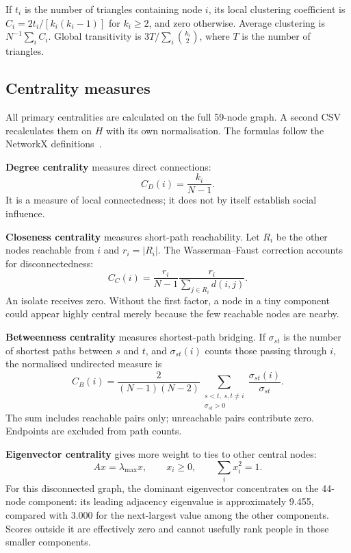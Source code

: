 \documentclass[11pt,a4paper]{article}
\begin{document}
If $t_i$ is the number of triangles containing node $i$, its local clustering
coefficient is $C_i=2t_i/[k_i(k_i-1)]$ for $k_i\geq2$, and zero otherwise.
Average clustering is $N^{-1}\sum_i C_i$. Global transitivity is
$3T/\sum_i\binom{k_i}{2}$, where $T$ is the number of triangles.

\subsection{Centrality measures}
All primary centralities are calculated on the full 59-node graph. A second CSV
recalculates them on $H$ with its own normalisation. The formulas follow the
NetworkX definitions~\cite{nxcentrality}.

\textbf{Degree centrality} measures direct connections:
\begin{equation}
C_D(i)=\frac{k_i}{N-1}.
\end{equation}
It is a measure of local connectedness; it does not by itself establish social
influence.

\textbf{Closeness centrality} measures short-path reachability. Let $R_i$ be the
other nodes reachable from $i$ and $r_i=|R_i|$. The Wasserman--Faust correction
accounts for disconnectedness:
\begin{equation}
C_C(i)=\frac{r_i}{N-1}\frac{r_i}{\sum_{j\in R_i}d(i,j)}.
\end{equation}
An isolate receives zero. Without the first factor, a node in a tiny component
could appear highly central merely because the few reachable nodes are nearby.

\textbf{Betweenness centrality} measures shortest-path bridging. If $\sigma_{st}$
is the number of shortest paths between $s$ and $t$, and $\sigma_{st}(i)$ counts
those passing through $i$, the normalised undirected measure is
\begin{equation}
C_B(i)=\frac{2}{(N-1)(N-2)}
\sum_{\substack{s<t,\;s,t\ne i\\\sigma_{st}>0}}
\frac{\sigma_{st}(i)}{\sigma_{st}}.
\end{equation}
The sum includes reachable pairs only; unreachable pairs contribute zero.
Endpoints are excluded from path counts.

\textbf{Eigenvector centrality} gives more weight to ties to other central nodes:
\begin{equation}
Ax=\lambda_{\max}x,\qquad x_i\geq0,\qquad \sum_i x_i^2=1.
\end{equation}
For this disconnected graph, the dominant eigenvector concentrates on the
44-node component: its leading adjacency eigenvalue is approximately 9.455,
compared with 3.000 for the next-largest value among the other components.
Scores outside it are effectively zero and cannot usefully rank people in those
smaller components.
\end{document}
